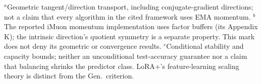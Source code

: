 \begin{table}[t]
\vspace{3pt}
\begin{minipage}{\linewidth}\scriptsize
$^{a}$Geometric tangent/direction transport, including conjugate-gradient
directions; not a claim that every algorithm in the cited framework uses
EMA momentum.
$^{b}$The reported iMuon momentum implementation uses factor buffers
(its Appendix K); the intrinsic direction's quotient symmetry is a separate
property. This mark does not deny its geometric or convergence results.
$^{c}$Conditional stability and capacity bounds; neither an unconditional
test-accuracy guarantee nor a claim that balancing shrinks the predictor class.
LoRA+'s feature-learning scaling theory is distinct from the Gen.\ criterion.
\end{minipage}
\endgroup
\end{table}
